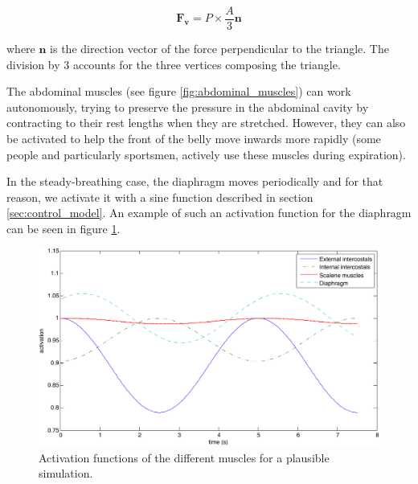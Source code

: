 \begin{equation}\label{eq:pressure_force}\mathbf{F_{v}} = P \times \frac{A}{3}\mathbf{n} \end{equation}

where $\mathbf{n}$ is the direction vector of the force perpendicular to the triangle. The division by 3 accounts for the three vertices composing the triangle.

The abdominal muscles (see figure \ref{fig:abdominal_muscles}) can work autonomously, trying to preserve the pressure in the abdominal cavity by contracting to their rest lengths when they are stretched. However, they can also be activated to help the front of the belly move inwards more rapidly (some people and particularly sportsmen, actively use these muscles during expiration).

In the steady-breathing case, the diaphragm moves periodically and for that reason, we activate it with a sine function described in section \ref{sec:control_model}. An example of such an activation function for the diaphragm can be seen in figure \ref{fig:simu_activations}.

\begin{figure}
	\centering
	 \includegraphics[width=1\textwidth]{pics/simu_act}
	\caption[Activation functions of the different muscles for a plausible simulation]{\label{fig:simu_activations}Activation functions of the different muscles for a plausible simulation.}	
\end{figure}